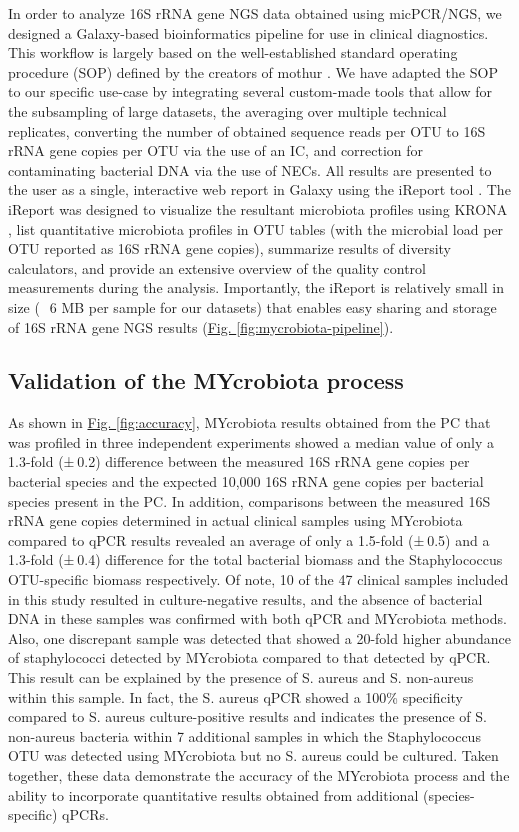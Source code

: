 In order to analyze 16S rRNA gene NGS data obtained using micPCR/NGS, we designed a Galaxy-based bioinformatics pipeline for use in clinical diagnostics. This workflow is largely based on the well-established standard operating procedure (SOP) defined by the creators of mothur \cite{kozich2013development}. We have adapted the SOP to our specific use-case by integrating several custom-made tools that allow for the subsampling of large datasets, the averaging over multiple technical replicates, converting the number of obtained sequence reads per OTU to 16S rRNA gene copies per OTU via the use of an IC, and correction for contaminating bacterial DNA via the use of NECs. All results are presented to the user as a single, interactive web report in Galaxy using the iReport tool \cite{hiltemann2014ireport}. The iReport was designed to visualize the resultant microbiota profiles using KRONA \cite{ondov2011interactive}, list quantitative microbiota profiles in OTU tables (with the microbial load per OTU reported as 16S rRNA gene copies), summarize results of diversity calculators, and provide an extensive overview of the quality control measurements during the analysis. Importantly, the iReport is relatively small in size (~ 6 MB per sample for our datasets) that enables easy sharing and storage of 16S rRNA gene NGS results (\hyperref[fig:mycrobiota-pipeline]{Fig. \ref{fig:mycrobiota-pipeline}}).


\subsection*{Validation of the MYcrobiota process}

As shown in \hyperref[fig:accuracy]{Fig. \ref{fig:accuracy}}, MYcrobiota results obtained from the PC that was profiled in three independent experiments showed a median value of only a 1.3-fold (± 0.2) difference between the measured 16S rRNA gene copies per bacterial species and the expected 10,000 16S rRNA gene copies per bacterial species present in the PC. In addition, comparisons between the measured 16S rRNA gene copies determined in actual clinical samples using MYcrobiota compared to qPCR results revealed an average of only a 1.5-fold (± 0.5) and a 1.3-fold (± 0.4) difference for the total bacterial biomass and the Staphylococcus OTU-specific biomass respectively. Of note, 10 of the 47 clinical samples included in this study resulted in culture-negative results, and the absence of bacterial DNA in these samples was confirmed with both qPCR and MYcrobiota methods. Also, one discrepant sample was detected that showed a 20-fold higher abundance of staphylococci detected by MYcrobiota compared to that detected by qPCR. This result can be explained by the presence of S. aureus and S. non-aureus within this sample. In fact, the S. aureus qPCR showed a 100\% specificity compared to S. aureus culture-positive results and indicates the presence of S. non-aureus bacteria within 7 additional samples in which the Staphylococcus OTU was detected using MYcrobiota but no S. aureus could be cultured. Taken together, these data demonstrate the accuracy of the MYcrobiota process and the ability to incorporate quantitative results obtained from additional (species-specific) qPCRs.



